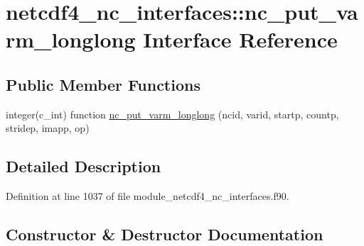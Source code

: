 \hypertarget{interfacenetcdf4__nc__interfaces_1_1nc__put__varm__longlong}{}\section{netcdf4\+\_\+nc\+\_\+interfaces\+:\+:nc\+\_\+put\+\_\+varm\+\_\+longlong Interface Reference}
\label{interfacenetcdf4__nc__interfaces_1_1nc__put__varm__longlong}
\subsection*{Public Member Functions}
\begin{DoxyCompactItemize}
\item 
integer(c\+\_\+int) function \hyperlink{interfacenetcdf4__nc__interfaces_1_1nc__put__varm__longlong_a903c27d51e70af9f14d553e987216ec8}{nc\+\_\+put\+\_\+varm\+\_\+longlong} (ncid, varid, startp, countp, stridep, imapp, op)
\end{DoxyCompactItemize}


\subsection{Detailed Description}


Definition at line 1037 of file module\+\_\+netcdf4\+\_\+nc\+\_\+interfaces.\+f90.



\subsection{Constructor \& Destructor Documentation}
\mbox{\label{interfacenetcdf4__nc__interfaces_1_1nc__put__varm__longlong_a903c27d51e70af9f14d553e987216ec8}} 
